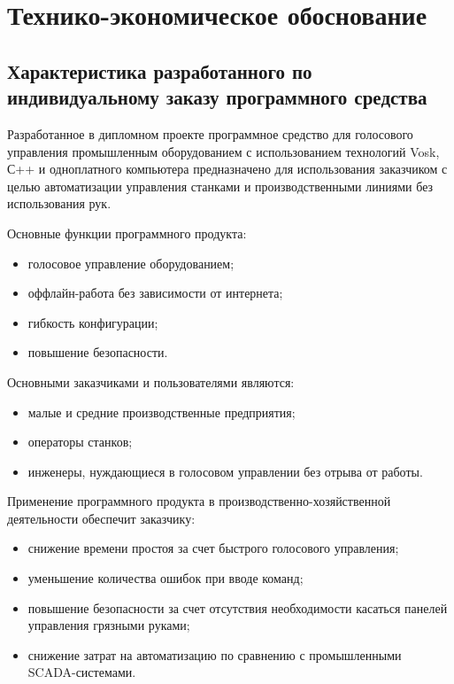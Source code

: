 \section{Технико-экономическое обоснование }

\subsection{Характеристика разработанного по индивидуальному заказу
	программного средства}

Разработанное в дипломном проекте программное средство для голосового управления промышленным оборудованием с использованием технологий Vosk, С++ и одноплатного компьютера предназначено для использования заказчиком с целью автоматизации управления станками и производственными линиями без использования рук.

Основные функции программного продукта:

\begin{itemize}
	\item голосовое управление оборудованием;
	
	\item оффлайн-работа без зависимости от интернета;
	
	\item гибкость конфигурации;
	
	\item повышение безопасности.

\end{itemize}

Основными заказчиками и пользователями являются:

\begin{itemize}
	\item малые и средние производственные предприятия;
	
	\item операторы станков;
	
	\item инженеры, нуждающиеся в голосовом управлении без отрыва от работы.
	
\end{itemize}


Применение программного продукта в производственно-хозяйственной деятельности обеспечит заказчику:
\begin{itemize}
	\item снижение времени простоя за счет быстрого голосового управления;
	\item уменьшение количества ошибок при вводе команд;
	\item повышение безопасности за счет отсутствия необходимости касаться панелей управления грязными руками;
	\item снижение затрат на автоматизацию по сравнению с промышленными SCADA-системами.
\end{itemize}


